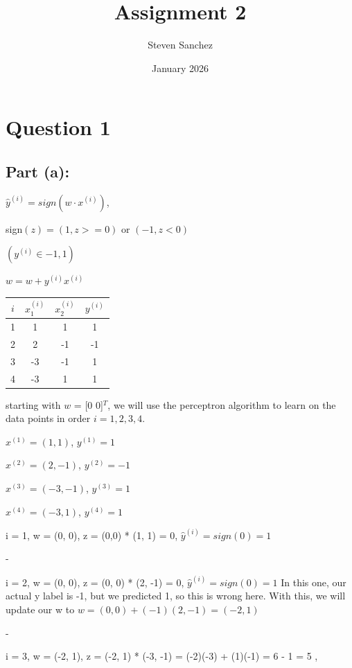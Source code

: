\documentclass{article}
\title{Assignment 2}
\author{Steven Sanchez}
\date{January 2026}
\begin{document}
\maketitle


\section*{Question 1}
\subsection*{Part (a):}
\begin{center}
$\hat{y}^{(i)} = sign(w \cdot x^{(i)})$, 

sign$(z) = (1, z>=0)$ or $(-1, z < 0)$


$(y^{(i)} \in {-1, 1})$


$w = w + y^{(i)}x^{(i)}$
\end{center}

\begin{center}
\begin{tabular}{|c|c|c|c|}
\hline
$i$ & $x_1^{(i)}$ & $x_2^{(i)}$ & $y^{(i)}$ \\
\hline
1 & 1 & 1 & 1 \\
2 & 2 & -1 & -1 \\
3 & -3 & -1 & 1 \\
4 & -3 & 1 & 1 \\
\hline
\end{tabular}
\end{center}

starting with $w$ = [0 0]$^{T}$, we will use the perceptron algorithm to learn on the data points in order $i = 1, 2, 3, 4$.
\begin{center}
$x^{(1)} = (1, 1)$, $y^{(1)} = 1$

$x^{(2)} = (2, -1)$, $y^{(2)} = -1$

$x^{(3)} = (-3, -1)$, $y^{(3)} = 1$

$x^{(4)} = (-3, 1)$, $y^{(4)} = 1$
\end{center}
i = 1, w = (0, 0), z = (0,0) * (1, 1) = 0,
$\hat{y}^{(i)} = sign(0) = 1$


-

i = 2, w = (0, 0), z = (0, 0) * (2, -1) = 0, 
$\hat{y}^{(i)} = sign(0) = 1$
In this one, our actual y label is -1, but we predicted 1, so this is wrong here. With this, we 
will update our w to $w = (0, 0) + (-1)(2, -1) = (-2, 1)$

-

i = 3, w = (-2, 1), z = (-2, 1) * (-3, -1) = (-2)(-3) + (1)(-1) = 6 - 1 = 5
,
\end{document}
